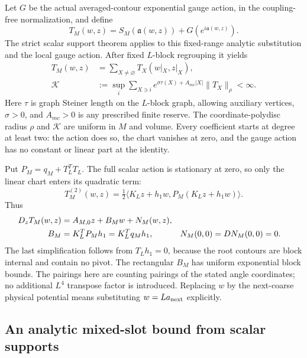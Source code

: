 \documentclass[11pt]{article}
\theoremstyle{remark}\newtheorem{remark}[theorem]{Remark}
\begin{document}
Let $G$ be the actual averaged-contour exponential gauge action, in the
coupling-free normalization, and define
\begin{equation}
 T_M(w,z)=S_M(\mathfrak a(w,z))+G(e^{i\mathfrak a(w,z)}).
                                                               \label{st-action}
\end{equation}
The strict scalar support theorem applies to this fixed-range analytic
substitution and the local gauge action. After fixed $L$-block
regrouping it yields
\begin{align}
 T_M(w,z)&=\sum_{X\ne\varnothing}T_X(w|_X,z|_X),             \label{st-scalar-expansion}\\
 \mathcal K&:=\sup_i\sum_{X\ni i}
 e^{\sigma\tau(X)+A_{
m c}|X|}\|T_X\|_\rho<\infty.         \label{st-scalar-norm}
\end{align}
Here $\tau$ is graph Steiner length on the $L$-block graph, allowing
auxiliary vertices, $\sigma>0$, and $A_{
m c}>0$ is any prescribed
finite reserve. The coordinate-polydisc radius $\rho$ and $\mathcal K$
are uniform in $M$ and volume. Every coefficient starts at degree at
least two: the action does so, the chart vanishes at zero, and the gauge
action has no constant or linear part at the identity.

Put $P_M=q_M+T_L^TT_L$. The full scalar action is stationary at zero, so
only the linear chart enters its quadratic term:
\begin{equation}
 T_M^{(2)}(w,z)=\tfrac12
 \langle K_Lz+h_1w,P_M(K_Lz+h_1w)\rangle.                    \label{st-quadratic-action}
\end{equation}
Thus
\begin{align}
 D_zT_M(w,z)&=A_{M,0}z+B_Mw+N_M(w,z),\notag\\
 B_M&=K_L^TP_Mh_1=K_L^Tq_Mh_1,&
 N_M(0,0)&=DN_M(0,0)=0.                                    \label{st-gradient-split}
\end{align}
The last simplification follows from $T_Lh_1=0$, because the root
contours are block internal and contain no pivot. The rectangular
$B_M$ has uniform exponential block bounds. The pairings here are
counting pairings of the stated angle coordinates; no additional
$L^4$ transpose factor is introduced. Replacing $w$ by the next-coarse
physical potential means substituting $w=L a_{\rm next}$ explicitly.

\subsection{An analytic mixed-slot bound from scalar supports}
\label{st-gradient-section}
\end{document}
